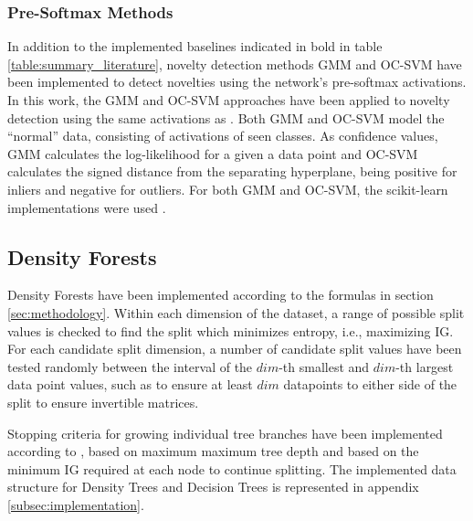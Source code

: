 \documentclass[10pt]{article}
\begin{document}
\subsubsection{Pre-Softmax Methods} 
In addition to the implemented baselines indicated in bold in table \ref{table:summary_literature}, novelty detection methods \gls{GMM} and \gls{OC-SVM} have been implemented to detect novelties using the network's pre-softmax activations. In this work, the \gls{GMM} and \gls{OC-SVM} approaches have been applied to novelty detection using the same activations as . Both \gls{GMM} and \gls{OC-SVM} model the ``normal'' data, consisting of activations of seen classes. As confidence values, \gls{GMM} calculates the log-likelihood for a given a data point and \gls{OC-SVM} calculates the signed distance from the separating hyperplane, being positive for inliers and negative for outliers. For both \gls{GMM} and \gls{OC-SVM}, the scikit-learn implementations were used \cite{scikit-learn}.  

\subsection{Density Forests}
Density Forests have been implemented according to the formulas in section \ref{sec:methodology}. Within each dimension of the dataset, a range of possible split values is checked to find the split which minimizes entropy, i.e., maximizing \acrlong{IG}. For each candidate split dimension, a number of candidate split values have been tested randomly between the interval of the $dim$-th smallest and $dim$-th largest data point values, such as to ensure at least $dim$ datapoints to either side of the split to ensure invertible matrices.

Stopping criteria for growing individual tree branches have been implemented according to \cite{decisionForests-MSR}, based on maximum maximum tree depth and based on the minimum \acrlong{IG} required at each node to continue splitting. The implemented data structure for Density Trees and Decision Trees is represented in appendix \ref{subsec:implementation}.
\end{document}
